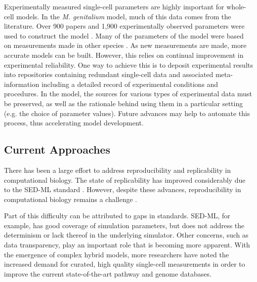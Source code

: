 \documentclass[journal,transmag,twoside]{IEEEtran}
\begin{document}
Experimentally measured single-cell parameters are highly important for whole-cell models.
In the \textit{M. genitalium} model, much of this data comes from the literature.
Over 900 papers and 1,900 experimentally observed parameters were used to construct the model \cite{Karr2012}.
Many of the parameters of the model were based on measurements made in other species \cite{macklin2014future}.
As new measurements are made, more accurate models can be built.
However, this relies on continual improvement in experimental reliability.
One way to achieve this is to deposit experimental results into repositories
containing redundant single-cell data and associated meta-information including
a detailed record of experimental conditions and procedures.
In the model, the sources for various types of experimental data must be preserved,
as well as the rationale behind using them in a particular setting
(e.g. the choice of parameter values).
Future advances may help to automate this process, thus accelerating model development.

\subsection{Current Approaches}

There has been a large effort to address reproducibility and replicability in computational biology.
The state of replicability has improved considerably due to the SED-ML standard \cite{sedml2011}.
However, despite these advances, reproducibility in computational biology remains a challenge \cite{garijo2013quantifying}.

Part of this difficulty can be attributed to gaps in standards.
SED-ML, for example, has good coverage of simulation parameters, but
does not address the determinism or lack thereof in the underlying simulator.
Other concerns, such as data transparency, play an important role that is becoming more apparent.
With the emergence of complex hybrid models, more researchers have noted the increased demand for curated, high quality single-cell measurements in order to improve the current state-of-the-art pathway and genome databases.
\end{document}
